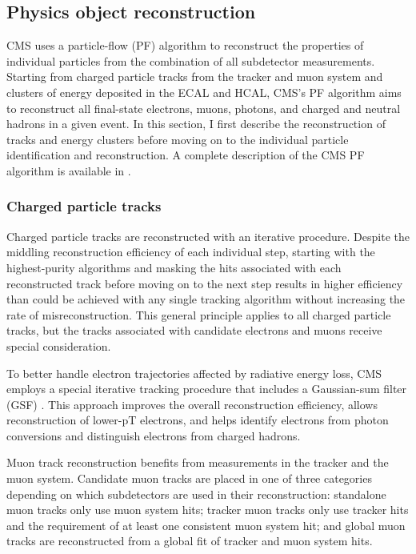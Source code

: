 \subsection{Physics object reconstruction}
CMS uses a particle-flow (PF) algorithm to reconstruct the properties of individual particles from the combination of all subdetector measurements. Starting from charged particle tracks from the tracker and muon system and clusters of energy deposited in the ECAL and HCAL, CMS's PF algorithm aims to reconstruct all final-state electrons, muons, photons, and charged and neutral hadrons in a given event. In this section, I first describe the reconstruction of tracks and energy clusters before moving on to the individual particle identification and reconstruction. A complete description of the CMS PF algorithm is available in \cite{cms_pf}.

\subsubsection{Charged particle tracks}
Charged particle tracks are reconstructed with an iterative procedure. Despite the middling reconstruction efficiency of each individual step, starting with the highest-purity algorithms and masking the hits associated with each reconstructed track before moving on to the next step results in higher efficiency than could be achieved with any single tracking algorithm without increasing the rate of misreconstruction. This general principle applies to all charged particle tracks, but the tracks associated with candidate electrons and muons receive special consideration.

To better handle electron trajectories affected by radiative energy loss, CMS employs a special iterative tracking procedure that includes a Gaussian-sum filter (GSF) \cite{gsf}. This approach improves the overall reconstruction efficiency, allows reconstruction of lower-pT electrons, and helps identify electrons from photon conversions and distinguish electrons from charged hadrons.

Muon track reconstruction benefits from measurements in the tracker and the muon system. Candidate muon tracks are placed in one of three categories depending on which subdetectors are used in their reconstruction: standalone muon tracks only use muon system hits; tracker muon tracks only use tracker hits and the requirement of at least one consistent muon system hit; and global muon tracks are reconstructed from a global fit of tracker and muon system hits.

